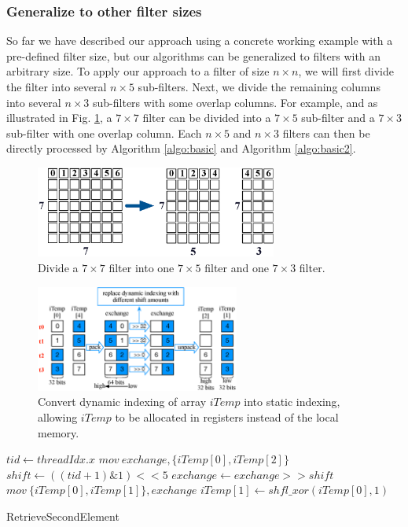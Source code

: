 \subsubsection{Generalize to other filter sizes} So far we have described our approach using a concrete working example with a pre-defined
filter size, but our algorithms can be generalized to filters with an arbitrary size. To apply our approach to a filter of size $n \times
n$, we will first divide the filter into several $n \times 5$ sub-filters. Next, we divide the remaining columns into several $n \times 3$
sub-filters with some overlap columns. For example, and as illustrated in Fig. \ref{fig:split7x7}, a $7 \times 7$ filter can be divided into
a $7 \times 5$ sub-filter and a $7 \times 3$ sub-filter with one overlap column. Each $n \times 5$ and $n \times 3$ filters can then be
directly processed by Algorithm \ref{algo:basic} and Algorithm \ref{algo:basic2}.
\begin{figure}[t!]
\centering
  \includegraphics[height=3cm]{./figure/split7x7.eps}
  \caption{Divide a $7 \times 7$ filter into one $7 \times 5$ filter and one $7 \times 3$ filter.}
  \label{fig:split7x7}
\end{figure}

\begin{figure}[t!]
	\centering
	\includegraphics[width=0.8\columnwidth,height=3.5cm]{./figure/exchange.eps}
\caption{Convert dynamic indexing of array $iTemp$ into static indexing, allowing  $iTemp$ to be allocated in registers instead of the local memory.}
\label{fig:exchange}
\end{figure}

\begin{algorithm}[t!]
\small
	$tid \gets threadIdx.x$\;
	$mov\ exchange, \{iTemp[0], iTemp[2]\}$\;
	$shift \gets ((tid+1)\&1)<<5$\;
	$exchange \gets exchange >> shift$\;
	$mov\ \{iTemp[0],iTemp[1]\}, exchange$\;
	$iTemp[1] \gets shfl\_xor(iTemp[0],1)$\;	
	\caption{RetrieveSecondElement}
	\label{algo:basic2}
\end{algorithm}


